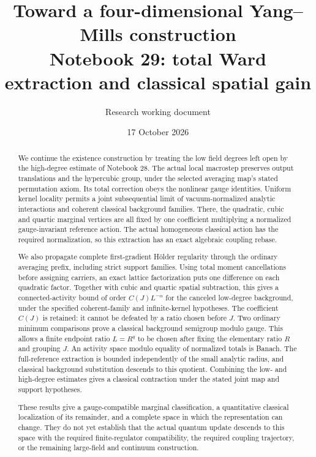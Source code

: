 \documentclass[11pt]{article}
\title{Toward a four-dimensional Yang--Mills construction\\
\large Notebook 29: total Ward extraction and classical spatial gain}
\author{Research working document}
\date{17 October 2026}
\theoremstyle{remark}
\begin{document}
\maketitle
\begin{abstract}
We continue the existence construction by treating the low field degrees
left open by the high-degree estimate of Notebook 28. The actual local
macrostep preserves output translations and the hypercubic group, under
the selected averaging map's stated permutation axiom. Its total
correction obeys the nonlinear gauge identities. Uniform kernel
locality permits a joint subsequential limit of vacuum-normalized
analytic interactions and coherent classical background families. There, the
quadratic, cubic and quartic marginal vertices are all fixed by one
coefficient multiplying a normalized gauge-invariant reference action.
The actual homogeneous classical action has the required normalization,
so this extraction has an exact algebraic coupling rebase.

We also propagate complete first-gradient H\"older regularity through
the ordinary averaging prefix, including strict support families.
Using total moment cancellations before assigning carriers, an exact
lattice factorization puts one difference on each quadratic factor.
Together with cubic and quartic spatial subtraction, this gives a
connected-activity bound of order \(C(J)L^{-\alpha}\) for the canceled
low-degree background, under the specified coherent-family and
infinite-kernel hypotheses. The coefficient \(C(J)\) is retained:
it cannot be defeated by a ratio chosen before \(J\).
Two ordinary minimum comparisons prove a classical background
semigroup modulo gauge. This allows a finite endpoint ratio
\(L=R^q\) to be chosen after fixing the elementary ratio \(R\)
and grouping \(J\).
An activity space modulo equality of normalized totals is Banach.
The full-reference extraction is bounded independently of the
small analytic radius, and classical background substitution
descends to this quotient. Combining the low- and high-degree
estimates gives a classical contraction under the stated joint
map and support hypotheses.

These results give a gauge-compatible marginal classification,
a quantitative classical localization of its remainder, and a
complete space in which the representation can change. They do
not yet establish that the actual quantum update descends to
this space with the required finite-regulator compatibility,
the required coupling trajectory,
or the remaining large-field and continuum construction.
\end{abstract}
\end{document}
